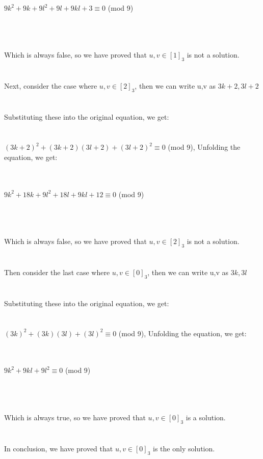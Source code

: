 \documentclass{article}
\begin{document}
\centerline{$9k^2+9k+9l^2+9l+9kl+3 \equiv 0$ (mod 9)}\\
\\ \hspace*{\fill} \\
Which is always false, so we have proved that $u,v \in [1]_3$ is not a solution.\\
\\ \hspace*{\fill} \\
Next, consider the case where $u,v \in [2]_3$, then we can write u,v as $3k+2,3l+2$\\
\\ \hspace*{\fill} \\
Substituting these into the original equation, we get:\\
\\ \hspace*{\fill} \\
$(3k+2)^2+(3k+2)(3l+2)+(3l+2)^2 \equiv 0$ (mod 9), 
Unfolding the equation, we get:\\
\\ \hspace*{\fill} \\
\centerline{$9k^2+18k+9l^2+18l+9kl+12 \equiv 0$ (mod 9)}\\
\\ \hspace*{\fill} \\
Which is always false, so we have proved that $u,v \in [2]_3$ is not a solution.\\
\\ \hspace*{\fill} \\
Then consider the last case where $u,v \in [0]_3$, then we can write u,v as $3k,3l$\\
\\ \hspace*{\fill} \\
Substituting these into the original equation, we get:\\
\\ \hspace*{\fill} \\
$(3k)^2+(3k)(3l)+(3l)^2 \equiv 0$ (mod 9), 
Unfolding the equation, we get:\\
\\ \hspace*{\fill} \\
\centerline{$9k^2+9kl+9l^2 \equiv 0$ (mod 9)}\\
\\ \hspace*{\fill} \\
Which is always true, so we have proved that $u,v \in [0]_3$ is a solution.\\
\\ \hspace*{\fill} \\
In conclusion, we have proved that $u,v \in [0]_3$ is the only solution.\\
\\ \hspace*{\fill} \\
\end{document}
